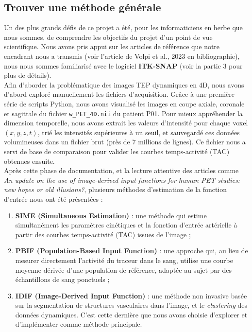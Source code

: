 \documentclass{article}
\begin{document}
    \subsection{Trouver une méthode générale}
        \begin{itemize}
            \noindent
            Un des plus grands défis de ce projet a été, pour les informaticiens en herbe que nous sommes, de comprendre les objectifs du projet d’un point de vue scientifique. Nous avons pris appui sur les articles de référence que notre encadrant nous a transmis (voir l'article de Volpi et al., 2023 en bibliographie), nous nous sommes familiarisé avec le logiciel \textbf{ITK-SNAP} (voir la partie 3 pour plus de détails).\\
            
            \noindent
            Afin d’aborder la problématique des images TEP dynamiques en 4D, nous avons d’abord exploré manuellement les fichiers d’acquisition. Grâce à une première série de scripts Python, nous avons visualisé les images en coupe axiale, coronale et sagittale du fichier \texttt{w\_PET\_4D.nii} du patient P01. Pour mieux appréhender la dimension temporelle, nous avons extrait les valeurs d’intensité pour chaque voxel $(x, y, z, t)$, trié les intensités supérieures à un seuil, et sauvegardé ces données volumineuses dans un fichier brut (près de 7 millions de lignes). Ce fichier nous a servi de base de comparaison pour valider les courbes temps-activité (TAC) obtenues ensuite.\\
            
            \noindent
            Après cette phase de documentation, et la lecture attentive des articles comme \emph{An update on the use of image-derived input functions for human PET studies: new hopes or old illusions?}, plusieurs méthodes d’estimation de la fonction d’entrée nous ont été présentées :

            \begin{enumerate}
                \item \textbf{SIME (Simultaneous Estimation)} : une méthode qui estime simultanément les paramètres cinétiques et la fonction d’entrée artérielle à partir des courbes temps-activité (TAC) issues de l’image ;
                \item \textbf{PBIF (Population-Based Input Function)} : une approche qui, au lieu de mesurer directement l'activité du traceur dans le sang, utilise une courbe moyenne dérivée d’une population de référence, adaptée au sujet par des échantillons de sang ponctuels ;
                \item \textbf{IDIF (Image-Derived Input Function)} : une méthode non invasive basée sur la segmentation de structures vasculaires dans l’image, et le \textit{clustering} des données dynamiques. C’est cette dernière que nous avons choisie d’explorer et d’implémenter comme méthode principale.
            \end{enumerate}
            

\end{itemize}
\end{document}
